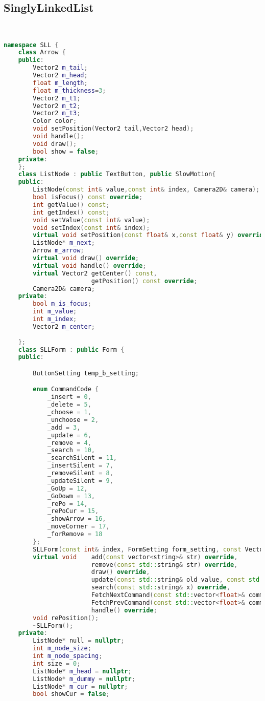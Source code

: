 \subsection{SinglyLinkedList}
\begin{lstlisting}[language=C++]


namespace SLL {
	class Arrow {
	public:
		Vector2 m_tail;
		Vector2 m_head;
		float m_length;
		float m_thickness=3;
		Vector2 m_t1;
		Vector2 m_t2;
		Vector2 m_t3;
		Color color;
		void setPosition(Vector2 tail,Vector2 head);
		void handle();
		void draw();
		bool show = false;
	private:
	};	
	class ListNode : public TextButton, public SlowMotion{
	public:
		ListNode(const int& value,const int& index, Camera2D& camera);
		bool isFocus() const override;
		int getValue() const;
		int getIndex() const;
		void setValue(const int& value);
		void setIndex(const int& index);
		virtual void setPosition(const float& x,const float& y) override;
		ListNode* m_next;
		Arrow m_arrow;
		virtual void draw() override;
		virtual void handle() override;
		virtual Vector2 getCenter() const,
                        getPosition() const override;
		Camera2D& camera;
	private:
		bool m_is_focus;
		int m_value;
		int m_index;
		Vector2 m_center;
		
	};
	class SLLForm : public Form {
	public:

		ButtonSetting temp_b_setting;

		enum CommandCode {
			_insert = 0,
			_delete = 5,
			_choose = 1,
			_unchoose = 2,
			_add = 3,
			_update = 6,
			_remove = 4,
			_search = 10,
			_searchSilent = 11,
			_insertSilent = 7,
			_removeSilent = 8,
			_updateSilent = 9,
			_GoUp = 12,
			_GoDowm = 13,
			_rePo = 14,
			_rePoCur = 15,
			_showArrow = 16,
			_moveCorner = 17,
			_forRemove = 18
		};
		SLLForm(const int& index, FormSetting form_setting, const Vector2& window_size);
		virtual void    add(const vector<string>& str) override,
						remove(const std::string& str) override,
						draw() override,
						update(const std::string& old_value, const std::string& new_value) override,
						search(const std::string& x) override,
						FetchNextCommand(const std::vector<float>& command) override,
                        FetchPrevCommand(const std::vector<float>& command) override,
						handle() override;
		void rePosition();
		~SLLForm();
	private:
		ListNode* null = nullptr;
		int m_node_size;
		int m_node_spacing;
		int size = 0;
		ListNode* m_head = nullptr;
		ListNode* m_dummy = nullptr;
		ListNode* m_cur = nullptr;
		bool showCur = false;


\end{lstlisting}
